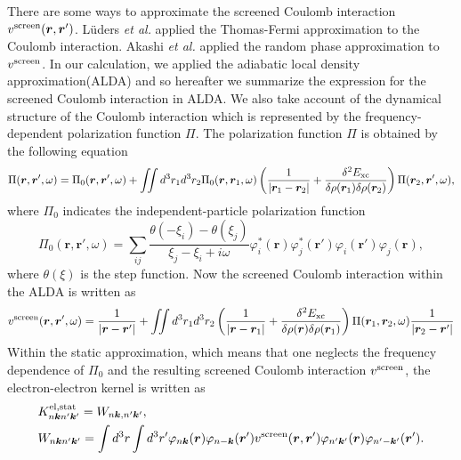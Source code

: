 There are some ways to approximate the screened Coulomb interaction $v^{\rm screen}(\bm r, \bm r')$. 
L\"{u}ders {\it et al.} applied the Thomas-Fermi approximation to the Coulomb interaction\cite{Luders2005}.
Akashi {\it et al.}\cite{RA2012} applied the random phase approximation to $v^{\rm screen}$.
In our calculation, we applied the adiabatic local density approximation(ALDA)\cite{Zangwill1980} and 
so hereafter we summarize the expression for the screened Coulomb interaction in ALDA.
We also take account of the dynamical structure of the Coulomb interaction which is represented by
the frequency-dependent polarization function $\Pi$.
The polarization function $\Pi$ is obtained by the following equation
%
\begin{equation}
	\Pi(\bm r, \bm r', \omega) = \Pi_0(\bm r, \bm r', \omega) + 
	\iint d^3r_1d^3r_2\Pi_0(\bm r, \bm r_1, \omega) 
	\left(
	\frac{1}{|\bm r_1 - \bm r_2|} + \frac{\delta^2E_{\rm xc}}{\delta\rho(\bm r_1)\delta\rho(\bm r_2)}
	\right)
	\Pi(\bm r_2, \bm r', \omega), 
	\label{eq:Pieq}
\end{equation}
%
where $\Pi_0$ indicates the independent-particle polarization function
%
\begin{equation}
	\Pi_0(\bm r, \bm r', \omega) = \sum_{ij}
	\frac{\theta(-\xi_i)-\theta(\xi_j)}{\xi_j-\xi_i+i\omega}
	\varphi^\ast_i(\bm r)\varphi^\ast_j(\bm r')\varphi_i(\bm r')\varphi_j(\bm r),
	\label{eq:chi0}
\end{equation}
%
where $\theta(\xi)$ is the step function.
Now the screened Coulomb interaction within the ALDA is written as
%
\begin{equation}
	v^{\rm screen}(\bm r, \bm r', \omega) = \frac{1}{|\bm r - \bm r'|} + 
	\iint d^3r_1 d^3r_2 
	\left(
	\frac{1}{|\bm r - \bm r_1|} + \frac{\delta^2E_{\rm xc}}{\delta\rho(\bm r)\delta\rho(\bm r_1)}
	\right)
	\Pi(\bm r_1, \bm r_2, \omega) \frac{1}{|\bm r_2 - \bm r'|}
	\label{eq:vscr}
\end{equation}
%
Within the static approximation, which means that one neglects the frequency dependence of $\Pi_0$ 
and the resulting screened Coulomb interaction $v^{\rm screen}$, the electron-electron kernel
is written as 
%
\begin{equation}
	\begin{split}
	& K^{\rm el, stat}_{n\bm kn' \bm k'} = W_{n \bm k, n' \bm k'}, \\
	& W_{n\bm kn'\bm k'} = 
	\int d^3r \int d^3r' \varphi_{n\bm k}(\bm r)\varphi_{n-\bm k}({\bm r'})
	v^{\rm screen}(\bm r, {\bm r'}) \varphi_{n'\bm k'}(\bm r) \varphi_{n'-\bm k'}({\bm r'}).
	\label{eq:Kelstat}
\end{split}
\end{equation}
